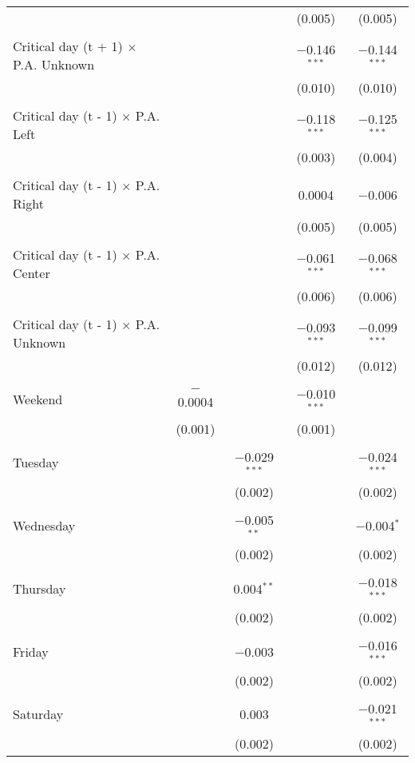 \documentclass[
]{article}
\begin{document}
\begin{table}[!htbp]
{\begin{tabular}{@{\extracolsep{5pt}}lcccc}
  &  &  & (0.005) & (0.005) \\ 
  & & & & \\ 
 Critical day (t + 1) $\times$ P.A. Unknown &  &  & $-$0.146$^{***}$ & $-$0.144$^{***}$ \\ 
  &  &  & (0.010) & (0.010) \\ 
  & & & & \\ 
 Critical day (t - 1) $\times$ P.A. Left &  &  & $-$0.118$^{***}$ & $-$0.125$^{***}$ \\ 
  &  &  & (0.003) & (0.004) \\ 
  & & & & \\ 
 Critical day (t - 1) $\times$ P.A. Right &  &  & 0.0004 & $-$0.006 \\ 
  &  &  & (0.005) & (0.005) \\ 
  & & & & \\ 
 Critical day (t - 1) $\times$ P.A. Center &  &  & $-$0.061$^{***}$ & $-$0.068$^{***}$ \\ 
  &  &  & (0.006) & (0.006) \\ 
  & & & & \\ 
 Critical day (t - 1) $\times$ P.A. Unknown &  &  & $-$0.093$^{***}$ & $-$0.099$^{***}$ \\ 
  &  &  & (0.012) & (0.012) \\ 
  & & & & \\ 
 Weekend & $-$0.0004 &  & $-$0.010$^{***}$ &  \\ 
  & (0.001) &  & (0.001) &  \\ 
  & & & & \\ 
 Tuesday &  & $-$0.029$^{***}$ &  & $-$0.024$^{***}$ \\ 
  &  & (0.002) &  & (0.002) \\ 
  & & & & \\ 
 Wednesday &  & $-$0.005$^{**}$ &  & $-$0.004$^{*}$ \\ 
  &  & (0.002) &  & (0.002) \\ 
  & & & & \\ 
 Thursday &  & 0.004$^{**}$ &  & $-$0.018$^{***}$ \\ 
  &  & (0.002) &  & (0.002) \\ 
  & & & & \\ 
 Friday &  & $-$0.003 &  & $-$0.016$^{***}$ \\ 
  &  & (0.002) &  & (0.002) \\ 
  & & & & \\ 
 Saturday &  & 0.003 &  & $-$0.021$^{***}$ \\ 
  &  & (0.002) &  & (0.002) \\ 

\end{tabular}}
\end{table}
\end{document}
